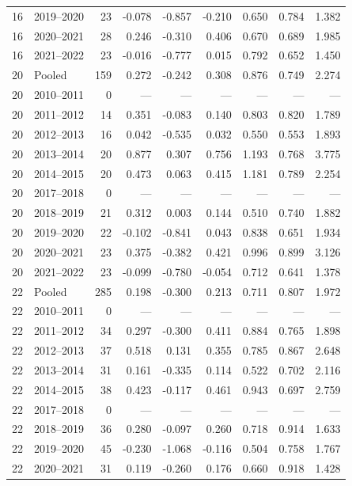 \begin{longtable}{llrrrrrrr}
16 & 2019--2020 & 23 & -0.078 & -0.857 & -0.210 & 0.650 & 0.784 & 1.382 \\
16 & 2020--2021 & 28 & 0.246 & -0.310 & 0.406 & 0.670 & 0.689 & 1.985 \\
16 & 2021--2022 & 23 & -0.016 & -0.777 & 0.015 & 0.792 & 0.652 & 1.450 \\
20 & Pooled & 159 & 0.272 & -0.242 & 0.308 & 0.876 & 0.749 & 2.274 \\
20 & 2010--2011 & 0 & --- & --- & --- & --- & --- & --- \\
20 & 2011--2012 & 14 & 0.351 & -0.083 & 0.140 & 0.803 & 0.820 & 1.789 \\
20 & 2012--2013 & 16 & 0.042 & -0.535 & 0.032 & 0.550 & 0.553 & 1.893 \\
20 & 2013--2014 & 20 & 0.877 & 0.307 & 0.756 & 1.193 & 0.768 & 3.775 \\
20 & 2014--2015 & 20 & 0.473 & 0.063 & 0.415 & 1.181 & 0.789 & 2.254 \\
20 & 2017--2018 & 0 & --- & --- & --- & --- & --- & --- \\
20 & 2018--2019 & 21 & 0.312 & 0.003 & 0.144 & 0.510 & 0.740 & 1.882 \\
20 & 2019--2020 & 22 & -0.102 & -0.841 & 0.043 & 0.838 & 0.651 & 1.934 \\
20 & 2020--2021 & 23 & 0.375 & -0.382 & 0.421 & 0.996 & 0.899 & 3.126 \\
20 & 2021--2022 & 23 & -0.099 & -0.780 & -0.054 & 0.712 & 0.641 & 1.378 \\
22 & Pooled & 285 & 0.198 & -0.300 & 0.213 & 0.711 & 0.807 & 1.972 \\
22 & 2010--2011 & 0 & --- & --- & --- & --- & --- & --- \\
22 & 2011--2012 & 34 & 0.297 & -0.300 & 0.411 & 0.884 & 0.765 & 1.898 \\
22 & 2012--2013 & 37 & 0.518 & 0.131 & 0.355 & 0.785 & 0.867 & 2.648 \\
22 & 2013--2014 & 31 & 0.161 & -0.335 & 0.114 & 0.522 & 0.702 & 2.116 \\
22 & 2014--2015 & 38 & 0.423 & -0.117 & 0.461 & 0.943 & 0.697 & 2.759 \\
22 & 2017--2018 & 0 & --- & --- & --- & --- & --- & --- \\
22 & 2018--2019 & 36 & 0.280 & -0.097 & 0.260 & 0.718 & 0.914 & 1.633 \\
22 & 2019--2020 & 45 & -0.230 & -1.068 & -0.116 & 0.504 & 0.758 & 1.767 \\
22 & 2020--2021 & 31 & 0.119 & -0.260 & 0.176 & 0.660 & 0.918 & 1.428 \\

\end{longtable}
